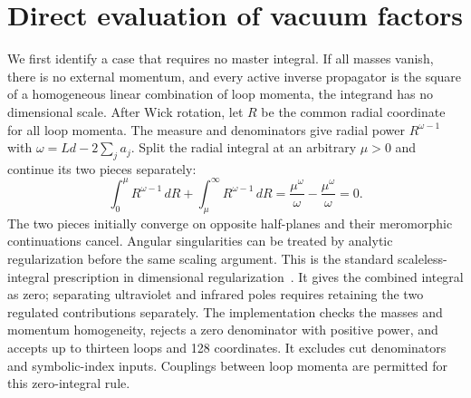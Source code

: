 \documentclass[11pt,a4paper]{article}
\begin{document}
\section{Direct evaluation of vacuum factors}
\label{notes-direct-app:direct-vacuum}
We first identify a case that requires no master integral. If all masses vanish, there is no external momentum, and every active inverse propagator is the square of a homogeneous linear combination of loop momenta, the integrand has no dimensional scale. After Wick rotation, let $R$ be the common radial coordinate for all loop momenta. The measure and denominators give radial power $R^{\omega-1}$ with $\omega=Ld-2\sum_j a_j$. Split the radial integral at an arbitrary $\mu>0$ and continue its two pieces separately:
\begin{equation}
 \int_0^\mu R^{\omega-1}\,dR+
 \int_\mu^\infty R^{\omega-1}\,dR
 =\frac{\mu^\omega}{\omega}-\frac{\mu^\omega}{\omega}=0.
 \label{notes-direct-eq:direct-scaleless}
\end{equation}
The two pieces initially converge on opposite half-planes and their meromorphic continuations cancel. Angular singularities can be treated by analytic regularization before the same scaling argument. This is the standard scaleless-integral prescription in dimensional regularization~\cite{Weinzierl2022}. It gives the combined integral as zero; separating ultraviolet and infrared poles requires retaining the two regulated contributions separately. The implementation checks the masses and momentum homogeneity, rejects a zero denominator with positive power, and accepts up to thirteen loops and 128 coordinates. It excludes cut denominators and symbolic-index inputs. Couplings between loop momenta are permitted for this zero-integral rule.
\end{document}

